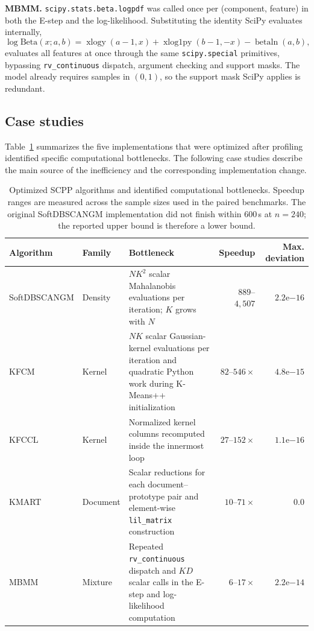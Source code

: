 \documentclass[twoside,11pt]{article}
\begin{document}
\medskip
\textbf{MBMM.} \texttt{scipy.stats.beta.logpdf} was called once per
(component, feature) in both the E-step and the log-likelihood. Substituting
the identity SciPy evaluates internally,
\[
\log \mathrm{Beta}(x; a, b) = \operatorname{xlogy}(a-1, x)
  + \operatorname{xlog1py}(b-1, -x) - \operatorname{betaln}(a, b),
\]
evaluates all features at once through the same \texttt{scipy.special}
primitives, bypassing \texttt{rv\_continuous} dispatch, argument checking and
support masks. The model already requires samples in $(0,1)$, so the support
mask SciPy applies is redundant.

\subsection{Case studies}

Table~\ref{tab:opt-cases} summarizes the five implementations that were
optimized after profiling identified specific computational bottlenecks. The
following case studies describe the main source of the inefficiency and the
corresponding implementation change.

\begin{table}[h!]
\centering
\caption{Optimized SCPP algorithms and identified computational bottlenecks.
Speedup ranges are measured across the sample sizes used in the paired
benchmarks. The original SoftDBSCANGM implementation did not
finish within $600$\,s at $n=240$; the reported upper bound is therefore a
lower bound.}
\label{tab:opt-cases}
\footnotesize
\setlength{\tabcolsep}{4pt}
\renewcommand{\arraystretch}{1.2}

\begin{tabular}{llp{5.1cm}rr}
\toprule
\textbf{Algorithm} &
\textbf{Family} &
\textbf{Bottleneck} &
\textbf{Speedup} &
\textbf{Max. deviation} \\
\midrule

\rowcolor{gray!10}
SoftDBSCANGM &
Density &
$NK^2$ scalar Mahalanobis evaluations per iteration; $K$ grows with $N$ &
$889$--$4{,}507$ &
$2.2\mathrm{e}{-16}$ \\

KFCM &
Kernel &
$NK$ scalar Gaussian-kernel evaluations per iteration and quadratic
Python work during K-Means++ initialization &
$82$--$546\times$ &
$4.8\mathrm{e}{-15}$ \\

\rowcolor{gray!10}
KFCCL &
Kernel &
Normalized kernel columns recomputed inside the innermost loop &
$27$--$152\times$ &
$1.1\mathrm{e}{-16}$ \\

KMART &
Document &
Scalar reductions for each document--prototype pair and element-wise
\texttt{lil\_matrix} construction &
$10$--$71\times$ &
$0.0$ \\

\rowcolor{gray!10}
MBMM &
Mixture &
Repeated \texttt{rv\_continuous} dispatch and $KD$ scalar calls in the
E-step and log-likelihood computation &
$6$--$17\times$ &
$2.2\mathrm{e}{-14}$ \\

\bottomrule
\end{tabular}
\end{table}
\end{document}
